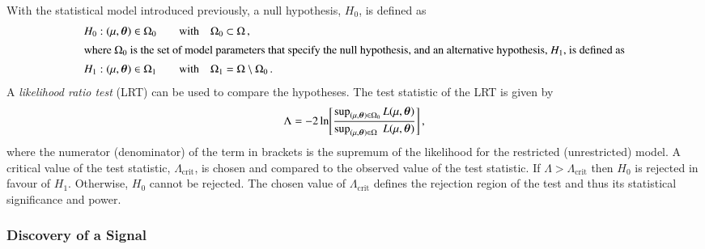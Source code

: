 With the statistical model introduced previously, a null hypothesis, $H_0$, is
defined as
\begin{alignat*}{3}
  &H_0: (\mu, \bm{\theta}) \in \Omega_0
    \quad &\text{with} \quad &\Omega_0 \subset \Omega \,\text{,} \\
  \intertext{where $\Omega_0$ is the set of model parameters that specify the
  null hypothesis, and an alternative hypothesis, $H_1$, is defined as}
  &H_1: (\mu, \bm{\theta}) \in \Omega_1
    \quad &\text{with} \quad &\Omega_1 = \Omega \setminus \Omega_0 \,\text{.}
\end{alignat*}
%
%
A \emph{likelihood ratio test} (LRT) can be used to compare the hypotheses. The
test statistic of the LRT is given by~\cite{casella2001}
\begin{align*}
  \Lambda = -2 \ln\mathopen{}\left[
  \frac{\sup_{(\mu, \bm{\theta}) \in \Omega_0} L(\mu, \bm{\theta})}
  {\sup_{(\mu, \bm{\theta}) \in \Omega\phantom{_0}} L(\mu, \bm{\theta})}
  \right]\mathclose{} \,\text{,}
\end{align*}
where the numerator (denominator) of the term in brackets is the supremum of the
likelihood for the restricted (unrestricted) model. A critical value of the test
statistic, $\Lambda_{\text{crit}}$, is chosen and compared to the observed value
of the test statistic. If $\Lambda > \Lambda_{\text{crit}}$ then $H_0$ is
rejected in favour of $H_1$. Otherwise, $H_0$ cannot be rejected. The chosen
value of $\Lambda_{\text{crit}}$ defines the rejection region of the test and
thus its statistical significance and power.


\subsubsection{Discovery of a Signal}

